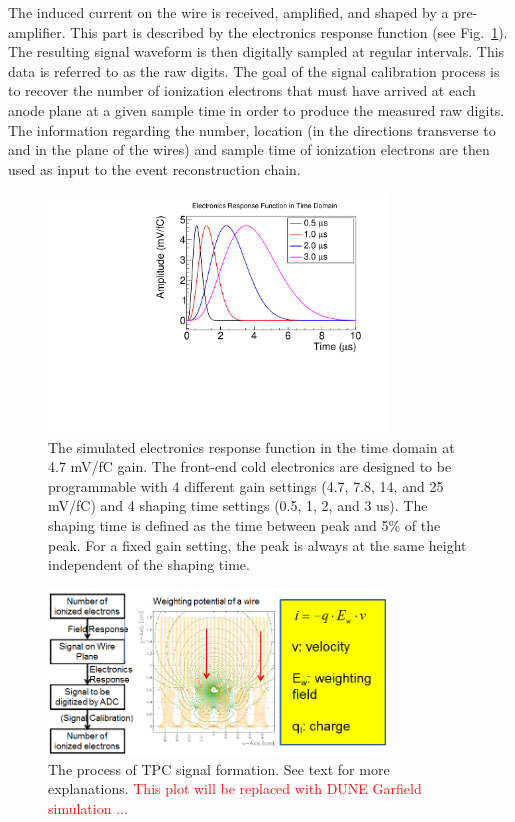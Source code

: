 The induced current on the wire is received, amplified, and shaped by
a pre-amplifier. This part is described by the electronics response
function (see Fig.~\ref{fig:ele_res}).  
The resulting signal waveform is then digitally sampled at
regular intervals.  This data is referred to as the raw digits.  The
goal of the signal calibration process is to recover the number of
ionization electrons that must have arrived at each anode plane at a
given sample time in order to produce the measured raw digits.  The
information regarding the number, location (in the directions transverse
to and in the plane of the wires) and sample time of ionization
electrons are then used as input to the event reconstruction chain.

\begin{figure}[htb]
\centering
\includegraphics[width=0.8\textwidth]{figures/electronics_res.pdf}
\caption{The simulated electronics response function in the time domain at 4.7 mV/fC gain. 
The front-end cold electronics are designed to be programmable with 4 different 
gain settings (4.7, 7.8, 14, and 25 mV/fC) and 4 shaping time settings 
(0.5, 1, 2, and 3 us). The shaping time is defined as the time 
between peak and 5\% of the peak. For a fixed gain setting, the peak 
is always at the same height independent of the shaping time. }
\label{fig:ele_res}
\end{figure}



\begin{figure}[htb]
\centering
\includegraphics[width=0.8\textwidth]{figures/Signal_formation.png}
\caption{The process of TPC signal formation. See text for more explanations.
\textcolor{red}{This plot will be replaced with DUNE Garfield simulation ...}}
\label{fig:signal_formation}
\end{figure}

